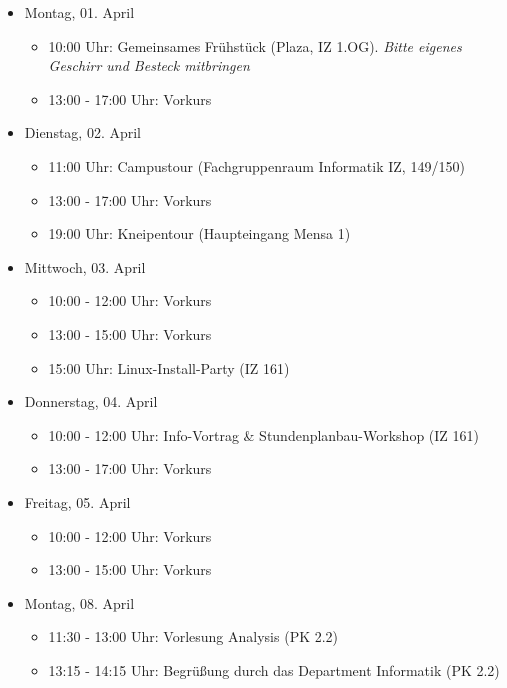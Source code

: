\begin{itemize}
    \item Montag, 01. April
        \begin{itemize}
            \item 10:00 Uhr: Gemeinsames Frühstück (Plaza, IZ 1.OG). \emph{Bitte eigenes Geschirr und Besteck mitbringen}
            \item 13:00 - 17:00 Uhr: Vorkurs
        \end{itemize}
    \item Dienstag, 02. April
        \begin{itemize}
            \item 11:00 Uhr: Campustour (Fachgruppenraum Informatik IZ, 149/150)
            \item 13:00 - 17:00 Uhr: Vorkurs
            \item 19:00 Uhr: Kneipentour (Haupteingang Mensa 1)
        \end{itemize}
    \item Mittwoch, 03. April
        \begin{itemize}
            \item 10:00 - 12:00 Uhr: Vorkurs
            \item 13:00 - 15:00 Uhr: Vorkurs
            \item 15:00 Uhr: Linux-Install-Party (IZ 161)
        \end{itemize}
    \pagebreak
    \item Donnerstag, 04. April
        \begin{itemize}
            \item 10:00 - 12:00 Uhr: Info-Vortrag \& Stundenplanbau-Workshop (IZ 161)
            \item 13:00 - 17:00 Uhr: Vorkurs
        \end{itemize}
    \item Freitag, 05. April
        \begin{itemize}
            \item 10:00 - 12:00 Uhr: Vorkurs
            \item 13:00 - 15:00 Uhr: Vorkurs
        \end{itemize}
    \item Montag, 08. April
        \begin{itemize}
	    \item 11:30 - 13:00 Uhr: Vorlesung Analysis (PK 2.2)
            \item 13:15 - 14:15 Uhr: Begrüßung durch das Department Informatik (PK 2.2)

\end{itemize}
\end{itemize}

